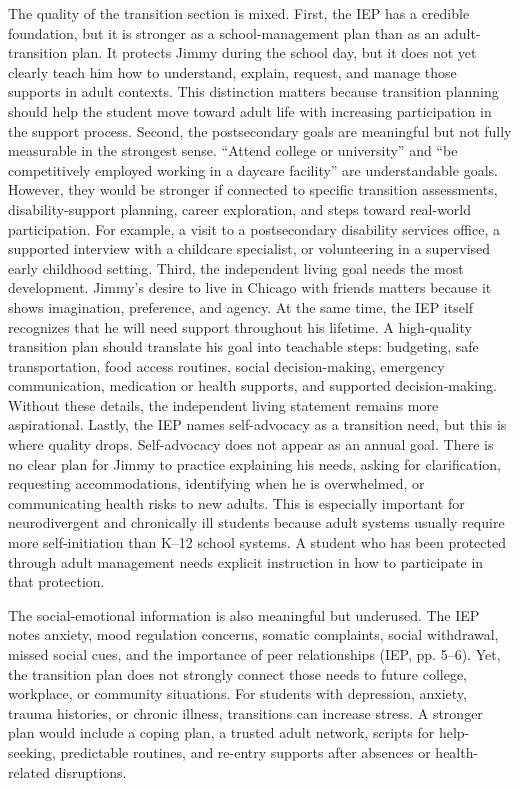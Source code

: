 \documentclass[11pt]{article}
\begin{document}
The quality of the transition section is mixed. First, the IEP has a credible foundation, but it is stronger as a school-management plan than as an adult-transition plan. It protects Jimmy during the school day, but it does not yet clearly teach him how to understand, explain, request, and manage those supports in adult contexts. This distinction matters because transition planning should help the student move toward adult life with increasing participation in the support process. Second, the postsecondary goals are meaningful but not fully measurable in the strongest sense. ``Attend college or university'' and ``be competitively employed working in a daycare facility'' are understandable goals. However, they would be stronger if connected to specific transition assessments, disability-support planning, career exploration, and steps toward real-world participation. For example, a visit to a postsecondary disability services office, a supported interview with a childcare specialist, or volunteering in a supervised early childhood setting. Third, the independent living goal needs the most development. Jimmy's desire to live in Chicago with friends matters because it shows imagination, preference, and agency. At the same time, the IEP itself recognizes that he will need support throughout his lifetime. A high-quality transition plan should translate his goal into teachable steps: budgeting, safe transportation, food access routines, social decision-making, emergency communication, medication or health supports, and supported decision-making. Without these details, the independent living statement remains more aspirational. Lastly, the IEP names self-advocacy as a transition need, but this is where quality drops. Self-advocacy does not appear as an annual goal. There is no clear plan for Jimmy to practice explaining his needs, asking for clarification, requesting accommodations, identifying when he is overwhelmed, or communicating health risks to new adults. This is especially important for neurodivergent and chronically ill students because adult systems usually require more self-initiation than K--12 school systems. A student who has been protected through adult management needs explicit instruction in how to participate in that protection.

The social-emotional information is also meaningful but underused. The IEP notes anxiety, mood regulation concerns, somatic complaints, social withdrawal, missed social cues, and the importance of peer relationships (IEP, pp. 5--6). Yet, the transition plan does not strongly connect those needs to future college, workplace, or community situations. For students with depression, anxiety, trauma histories, or chronic illness, transitions can increase stress. A stronger plan would include a coping plan, a trusted adult network, scripts for help-seeking, predictable routines, and re-entry supports after absences or health-related disruptions.
\end{document}
